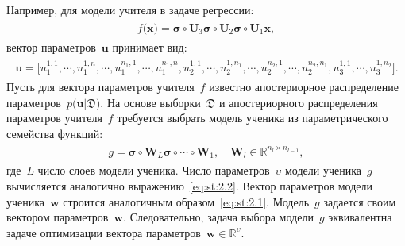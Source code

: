 \documentclass[12pt]{a&t}
\begin{document}
Например, для модели учителя в задаче регрессии:
\begin{gather}
\label{eq:st:3}
\begin{aligned}
f\bigr(\mathbf{x}\bigr) = \bm{\sigma} \circ \mathbf{U}_3 \bm{\sigma} \circ \mathbf{U}_2\bm{\sigma}\circ \mathbf{U}_1\mathbf{x},
\end{aligned}
\end{gather}
вектор параметров~$\mathbf{u}$ принимает вид:
\begin{gather}
\label{eq:st:4}
\begin{aligned}
\mathbf{u} = \bigr[u_1^{1,1}, \cdots, u_1^{1,n},
                                               \cdots, 
                             u_1^{n_1,1}, \cdots, u_1^{n_1,n},  
                             u_2^{1, 1}, \cdots, u_2^{1, n_1}, 
                                                \cdots, 
                            u_2^{n_2, 1}, \cdots, u_2^{n_2, n_1},
                            u_3^{1, 1}, \cdots, u_3^{1, n_2}\bigr].
\end{aligned}
\end{gather}
Пусть для вектора параметров учителя~$f$ известно апостериорное распределение параметров~$p\bigr(\mathbf{u}|\mathfrak{D}\bigr)$. 
На основе выборки~$\mathfrak{D}$ и апостериорного распределения параметров учителя~$f$ требуется выбрать модель ученика из параметрического семейства функций:
\begin{gather}
\label{eq:st:5}
\begin{aligned}
g = \bm{\sigma} \circ \mathbf{W}_L\bm{\sigma}  \circ \cdots \circ \mathbf{W}_1, \quad \mathbf{W}_l \in \mathbb{R}^{n_l \times n_{l-1}},
\end{aligned}
\end{gather}
где~$L$ число слоев модели ученика. Число параметров~$\upsilon$ модели ученика~$g$ вычисляется аналогично выражению~\eqref{eq:st:2.2}. Вектор параметров модели ученика~$\mathbf{w}$ строится аналогичным образом~\eqref{eq:st:2.1}. Модель~$g$ задается своим вектором параметров~$\mathbf{w}$. Следовательно, задача выбора модели~$g$ эквивалентна задаче оптимизации вектора параметров~$\mathbf{w}\in\mathbb{R}^{\upsilon}$.
\end{document}

